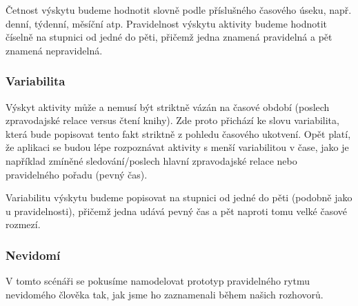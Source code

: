 \documentclass[thesis=M,czech]{FITthesis}[2012/06/26]
\begin{document}
Četnost výskytu budeme hodnotit slovně podle příslušného časového úseku, např. denní, týdenní, měsíční atp. Pravidelnost výskytu aktivity budeme hodnotit číselně na stupnici od jedné do pěti, přičemž jedna znamená pravidelná a pět znamená nepravidelná.

\subsubsection*{Variabilita}
Výskyt aktivity může a nemusí být striktně vázán na časové období (poslech zpravodajské relace versus čtení knihy). Zde proto přichází ke slovu variabilita, která bude popisovat tento fakt striktně z pohledu časového ukotvení. Opět platí, že aplikaci se budou lépe rozpoznávat aktivity s menší variabilitou v čase, jako je například zmíněné sledování/poslech hlavní zpravodajské relace nebo pravidelného pořadu (pevný čas).

Variabilitu výskytu budeme popisovat na stupnici od jedné do pěti (podobně jako u pravidelnosti), přičemž jedna udává pevný čas a pět naproti tomu velké časové rozmezí.

\subsubsection*{Nevidomí}
V tomto scénáři se pokusíme namodelovat prototyp pravidelného rytmu nevidomého člověka tak, jak jsme ho zaznamenali během našich rozhovorů.
\end{document}
